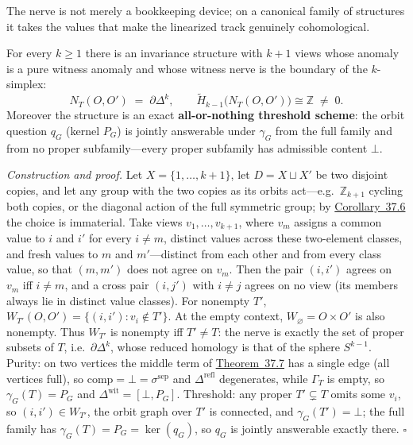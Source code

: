 
The nerve is not merely a bookkeeping device; on a canonical family of structures it takes the values that make the linearized track genuinely cohomological.

\begin{thmplain}

For every \(k \ge 1\) there is an invariance structure with \(k+1\) views whose anomaly is a pure witness anomaly and whose witness nerve is the boundary of the \(k\)-simplex:
\[
N_T(O, O') \;=\; \partial \Delta^k,
\qquad
\widetilde{H}_{k-1}\big(N_T(O,O')\big) \cong \mathbb{Z} \;\ne\; 0 .
\]
Moreover the structure is an exact \textbf{all-or-nothing threshold scheme}: the orbit question \(q_G\) (kernel \(P_G\)) is jointly answerable under \(\gamma_G\) from the full family and from no proper subfamily---\hspace{0pt}every proper subfamily has admissible content \(\bot\).

\emph{Construction and proof.} Let \(X = \{1, \dots, k+1\}\), let \(D = X \sqcup X'\) be two disjoint copies, and let any group with the two copies as its orbits act---\hspace{0pt}e.g.~\(\mathbb{Z}_{k+1}\) cycling both copies, or the diagonal action of the full symmetric group; by \hyperlink{stmt:37.6}{Corollary~37.6} the choice is immaterial. Take views \(v_1, \dots, v_{k+1}\), where \(v_m\) assigns a common value to \(i\) and \(i'\) for every \(i \ne m\), distinct values across these two-element classes, and fresh values to \(m\) and \(m'\)---\hspace{0pt}distinct from each other and from every class value, so that \((m, m')\) does not agree on \(v_m\). Then the pair \((i, i')\) agrees on \(v_m\) iff \(i \ne m\), and a cross pair \((i, j')\) with \(i \ne j\) agrees on no view (its members always lie in distinct value classes). For nonempty \(T'\), \(W_{T'}(O,O')=\{(i,i'):v_i\notin T'\}\). At the empty context, \(W_\varnothing=O\times O'\) is also nonempty. Thus \(W_{T'}\) is nonempty iff \(T'\ne T\): the nerve is exactly the set of proper subsets of \(T\), i.e.~\(\partial\Delta^k\), whose reduced homology is that of the sphere \(S^{k-1}\). Purity: on two vertices the middle term of \hyperlink{stmt:37.7}{Theorem~37.7} has a single edge (all vertices full), so \(\mathrm{comp} = \bot = \sigma^{\mathrm{sep}}\) and \(\Delta^{\mathrm{refl}}\) degenerates, while \(\Gamma_T\) is empty, so \(\gamma_G(T) = P_G\) and \(\Delta^{\mathrm{wit}} = [\bot, P_G]\). Threshold: any proper \(T' \subsetneq T\) omits some \(v_i\), so \((i, i') \in W_{T'}\), the orbit graph over \(T'\) is connected, and \(\gamma_G(T') = \bot\); the full family has \(\gamma_G(T) = P_G = \ker(q_G)\), so \(q_G\) is jointly answerable exactly there. \(\square\)
\end{thmplain}


